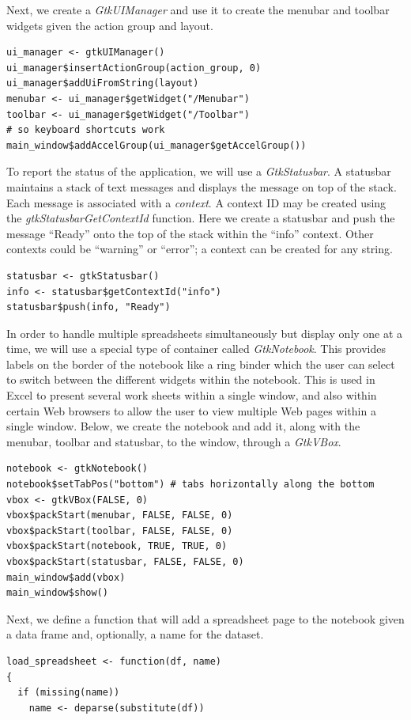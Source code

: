 \documentclass[article]{jss}
\begin{document}
Next, we create a \emph{GtkUIManager} and use it to create the menubar and
toolbar widgets given the action group and layout.
\begin{verbatim}
ui_manager <- gtkUIManager()
ui_manager$insertActionGroup(action_group, 0)
ui_manager$addUiFromString(layout)
menubar <- ui_manager$getWidget("/Menubar")
toolbar <- ui_manager$getWidget("/Toolbar")
# so keyboard shortcuts work
main_window$addAccelGroup(ui_manager$getAccelGroup()) 
\end{verbatim}
To report the status of the application, we will use a \emph{GtkStatusbar}. 
A statusbar maintains a stack of text messages and displays the message
on top of the stack. Each message is associated with a \emph{context}. A context
ID may be created using the \emph{gtkStatusbarGetContextId} function. Here we create a 
statusbar and push the message ``Ready'' onto the top of the stack within
the ``info'' context. Other contexts could be ``warning'' or ``error''; a context
can be created for any string.
\begin{verbatim}
statusbar <- gtkStatusbar()
info <- statusbar$getContextId("info")
statusbar$push(info, "Ready") 
\end{verbatim}
In order to handle multiple spreadsheets simultaneously but display
only one at a time, we will use a special type of container called
\emph{GtkNotebook}.  This provides labels on the border of the
notebook like a ring binder which the user can select to switch
between the different widgets within the notebook.  This is used in
Excel to present several work sheets within a single window, and also
within certain Web browsers to allow the user to view multiple Web
pages within a single window. Below, we create the notebook and add
it, along with the menubar, toolbar and statusbar, to the window,
through a \emph{GtkVBox}.
\begin{verbatim}
notebook <- gtkNotebook()
notebook$setTabPos("bottom") # tabs horizontally along the bottom
vbox <- gtkVBox(FALSE, 0)
vbox$packStart(menubar, FALSE, FALSE, 0)
vbox$packStart(toolbar, FALSE, FALSE, 0)
vbox$packStart(notebook, TRUE, TRUE, 0)
vbox$packStart(statusbar, FALSE, FALSE, 0)
main_window$add(vbox)
main_window$show()
\end{verbatim}
Next, we define a function that will add a spreadsheet page to the notebook
given a data frame and, optionally, a name for the dataset.
\begin{verbatim}
load_spreadsheet <- function(df, name)
{
  if (missing(name))
    name <- deparse(substitute(df))
\end{verbatim}
\end{document}
